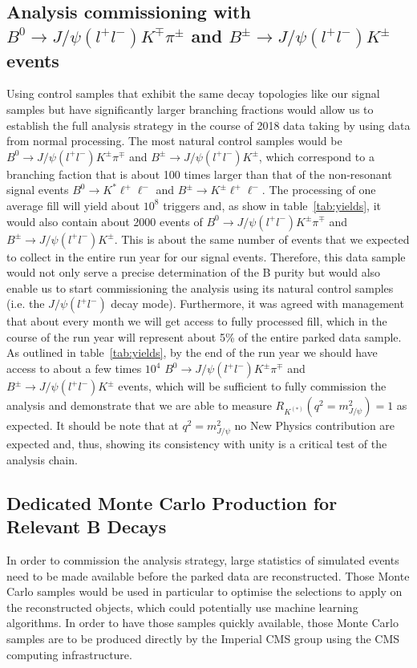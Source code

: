 \documentclass[a4paper,11pt]{article}
\begin{document}
\subsection{Analysis commissioning with $B^0\rightarrow J/\psi(l^+l^-) K^{\mp} \pi^{\pm}$ and $B^{\pm} \rightarrow J/\psi(l^+l^-)  K^{\pm}$ events} \label{jpsi} 
Using control samples that exhibit the same decay topologies like our signal samples but have significantly larger branching fractions would allow us to establish the full analysis strategy in the course of 2018 data taking by using data from normal processing. The most natural control samples would be $B^0\rightarrow J/\psi(l^+l^-) K^{\pm} \pi^{\mp}$ and $B^{\pm} \rightarrow J/\psi(l^+l^-)  K^{\pm}$, which correspond to a branching faction that is about 100 times larger than that of the non-resonant signal events $B^0\rightarrow K^* \ell^+\ell^-$  and $B^{\pm}\rightarrow K^{\pm} \ell^+\ell^-$.
The processing of one average fill will yield about $10^8 $ triggers and, as show in table~\ref{tab:yields}, it would also contain about 2000 events of $B^0\rightarrow J/\psi(l^+l^-) K^{\pm} \pi^{\mp}$ and $B^{\pm} \rightarrow J/\psi(l^+l^-)  K^{\pm}$. This is about the same number of events that we expected to collect in the entire run year for our signal events. Therefore, this data sample would not only serve a precise determination of the B purity but would also enable us to start commissioning the analysis using its natural control samples (i.e. the $J/\psi(l^+l^-)$ decay mode). 
Furthermore, it was agreed with management that about every month we will get access to fully processed fill, which in the course of the run year will represent about 5\% of the entire parked data sample. As outlined in table~\ref{tab:yields}, by the end of the run year we should have access to about a few times $10^4$ $B^0\rightarrow J/\psi(l^+l^-) K^{\pm} \pi^{\mp}$ and $B^{\pm} \rightarrow J/\psi(l^+l^-)  K^{\pm}$ events, which will be sufficient to fully commission the analysis and demonstrate that we are able to measure   $R_{K^{(*)}} (q^2 = m_{J/\psi}^2) =1$ as expected. It should be note that at $q^2 = m_{J/\psi}^2$ no New Physics contribution are expected and, thus, showing its consistency with unity is a critical test of the analysis chain.  

\subsection{Dedicated Monte Carlo Production for Relevant B Decays}\label{mc}
In order to commission the analysis strategy, large statistics of simulated events need to be made available before the parked data are reconstructed. Those Monte Carlo samples would be used in particular to optimise the selections to apply on the reconstructed objects, which could potentially use machine learning algorithms. In order to have those samples quickly available, those Monte Carlo samples are to be produced directly by the Imperial CMS group using the CMS computing infrastructure.
\end{document}

